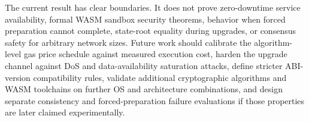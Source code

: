 \documentclass[pdflatex,sn-mathphys-num]{sn-jnl}%
\theoremstyle{thmstyleone}%
\theoremstyle{thmstyletwo}%
\theoremstyle{thmstylethree}%
\begin{document}
The current result has clear boundaries. It does not prove zero-downtime service availability, formal WASM sandbox security theorems, behavior when forced preparation cannot complete, state-root equality during upgrades, or consensus safety for arbitrary network sizes. Future work should calibrate the algorithm-level gas price schedule against measured execution cost, harden the upgrade channel against DoS and data-availability saturation attacks, define stricter ABI-version compatibility rules, validate additional cryptographic algorithms and WASM toolchains on further OS and architecture combinations, and design separate consistency and forced-preparation failure evaluations if those properties are later claimed experimentally.
%
%
%
%
%
%
%
%
\end{document}
